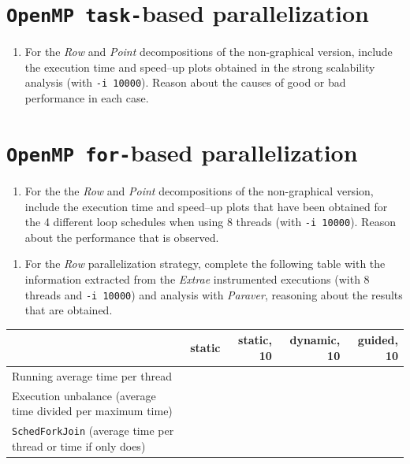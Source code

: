 \documentclass[a4paper]{article}
\begin{document}
\section{\texttt{OpenMP task-}based parallelization}

\begin{enumerate}
	\item For the \textit{Row} and \textit{Point} decompositions of the non-graphical version, include the execution time and speed–up plots obtained in the strong scalability analysis (with \texttt{-i 10000}). Reason about the causes of good or bad performance in each case.
\end{enumerate}

\section{\texttt{OpenMP for-}based parallelization}

\begin{enumerate}
	\item For the the \textit{Row} and \textit{Point} decompositions of the non-graphical version, include the execution time and speed–up plots that have been obtained for the 4 different loop schedules when using 8 threads (with \texttt{-i 10000}). Reason about the performance that is observed.
\end{enumerate}

\begin{enumerate}[resume]
	\item For the \textit{Row} parallelization strategy, complete the following table with the information extracted from the \textit{Extrae} instrumented executions (with 8 threads and \texttt{-i 10000}) and analysis with \textit{Paraver}, reasoning about the results that are obtained.
\end{enumerate}

\begin{table}[H]
	\centering
	\tablinesep=0.5cm
	\begin{tabular}{p{5cm}|rrrr}
		& \textbf{static} & \textbf{static, 10} & \textbf{dynamic, 10} & \textbf{guided, 10} \\
		\hline
		Running average time per thread & & & & \\
		Execution unbalance (average time divided per maximum time) & & & & \\
		\texttt{SchedForkJoin} (average time per thread or time if only does)
	\end{tabular}
\end{table}
\end{document}
